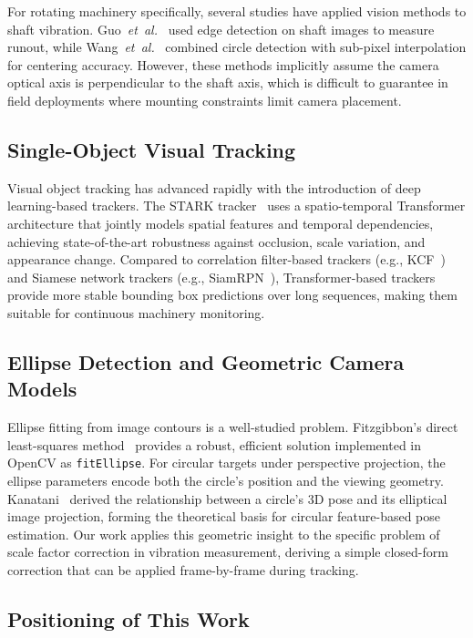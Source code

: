 \documentclass[journal]{IEEEtran}
\begin{document}
For rotating machinery specifically, several studies have applied vision methods
to shaft vibration. Guo~\emph{et~al.}~\cite{guo2016} used edge detection on shaft
images to measure runout, while Wang~\emph{et~al.}~\cite{wang2019} combined
circle detection with sub-pixel interpolation for centering accuracy. However,
these methods implicitly assume the camera optical axis is perpendicular to the
shaft axis, which is difficult to guarantee in field deployments where mounting
constraints limit camera placement.

\subsection{Single-Object Visual Tracking}

Visual object tracking has advanced rapidly with the introduction of deep
learning-based trackers. The STARK tracker~\cite{yan2021} uses a spatio-temporal
Transformer architecture that jointly models spatial features and temporal
dependencies, achieving state-of-the-art robustness against occlusion, scale
variation, and appearance change. Compared to correlation filter-based trackers
(e.g., KCF~\cite{henriques2015}) and Siamese network trackers
(e.g., SiamRPN~\cite{li2018}), Transformer-based trackers provide more stable
bounding box predictions over long sequences, making them suitable for continuous
machinery monitoring.

\subsection{Ellipse Detection and Geometric Camera Models}

Ellipse fitting from image contours is a well-studied problem. Fitzgibbon's
direct least-squares method~\cite{fitzgibbon1999} provides a robust, efficient
solution implemented in OpenCV as \texttt{fitEllipse}. For circular targets under
perspective projection, the ellipse parameters encode both the circle's position
and the viewing geometry. Kanatani~\cite{kanatani1993} derived the relationship
between a circle's 3D pose and its elliptical image projection, forming the
theoretical basis for circular feature-based pose estimation. Our work applies
this geometric insight to the specific problem of scale factor correction in
vibration measurement, deriving a simple closed-form correction that can be
applied frame-by-frame during tracking.

\subsection{Positioning of This Work}
\end{document}
